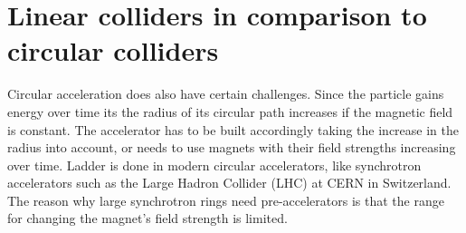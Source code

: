 \section{Linear colliders in comparison to circular colliders}
\label{Linear-Circular}

Circular acceleration does also have certain challenges.
Since the particle gains energy over time its the radius of its circular path increases if the magnetic field is constant.
The accelerator has to be built accordingly taking the increase in the radius into account, or needs to use magnets with their field strengths increasing over time.
Ladder is done in modern circular accelerators, like synchrotron accelerators such as the Large Hadron Collider (LHC) at CERN in Switzerland.
The reason why large synchrotron rings need pre-accelerators is that the range for changing the magnet's field strength is limited.